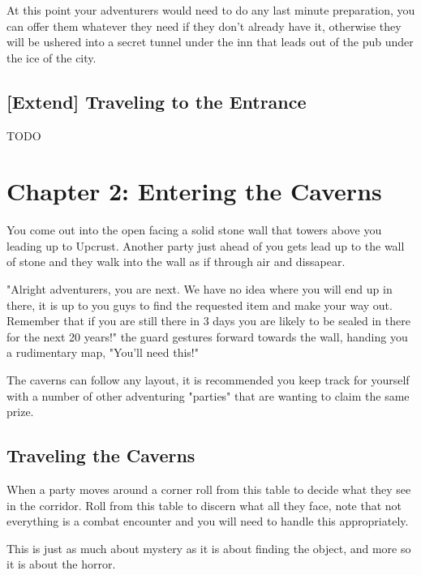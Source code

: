 \documentclass[10pt,twoside,twocolumn]{article}
\begin{document}
At this point your adventurers would need to do any last minute preparation, you can offer them whatever they need if they don't already have it, otherwise they will be ushered into a secret tunnel under the inn that leads out of the pub under the ice of the city. \\

\subsection{[Extend] Traveling to the Entrance}
TODO \\

\section{Chapter 2: Entering the Caverns}
You come out into the open facing a solid stone wall that towers above you leading up to Upcrust. Another party just ahead of you gets lead up to the wall of stone and they walk into the wall as if through air and dissapear.

\begin{quotebox}
"Alright adventurers, you are next. We have no idea where you will end up in there, it is up to you guys to find the requested item and make your way out. Remember that if you are still there in 3 days you are likely to be sealed in there for the next 20 years!" the guard gestures forward towards the wall, handing you a rudimentary map, "You'll need this!"
\end{quotebox}

The caverns can follow any layout, it is recommended you keep track for yourself with a number of other adventuring "parties" that are wanting to claim the same prize.

\subsection{Traveling the Caverns}
When a party moves around a corner roll from this table to decide what they see in the corridor. Roll from this table to discern what all they face, note that not everything is a combat encounter and you will need to handle this appropriately.

\begin{dndtable}

\end{dndtable}

This is just as much about mystery as it is about finding the object, and more so it is about the horror. \\
\end{document}
